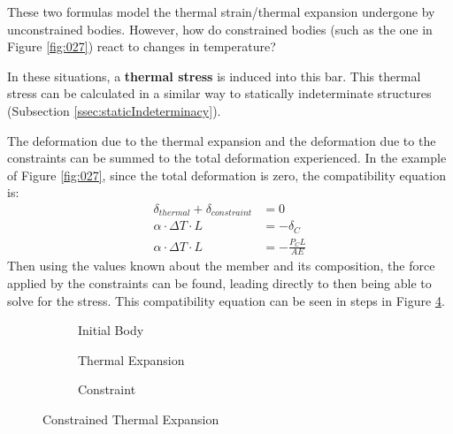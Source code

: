 \documentclass[12pt]{article}
\begin{document}
These two formulas model the thermal strain/thermal expansion undergone by unconstrained bodies. However, how do constrained bodies (such as the one in Figure \ref{fig:027}) react to changes in temperature?

In these situations, a \textbf{thermal stress} is induced into this bar. This thermal stress can be calculated in a similar way to statically indeterminate structures (Subsection \ref{ssec:staticIndeterminacy}).

The deformation due to the thermal expansion and the deformation due to the constraints can be summed to the total deformation experienced. In the example of Figure \ref{fig:027}, since the total deformation is zero, the compatibility equation is:
\begin{align*}
  \delta_{thermal} + \delta_{constraint} &= 0 \\
  \alpha \cdot \Delta T \cdot L &= - \delta_C \\
  \alpha \cdot \Delta T \cdot L &= -\frac{P_CL}{AE}
\end{align*}
Then using the values known about the member and its composition, the force applied by the constraints can be found, leading directly to then being able to solve for the stress. This compatibility equation can be seen in steps in Figure \ref{fig:constrainedThermalExpansion}.

\begin{figure}[H]
  \centering
  \begin{subfigure}[t!]{0.3\textwidth}
    \centering
    
    \caption{Initial Body}
    \label{fig:030}
  \end{subfigure}
  \begin{subfigure}[t!]{0.3\textwidth}
    \centering
    
    \caption{Thermal Expansion}
    \label{fig:031}
  \end{subfigure}
  \begin{subfigure}[t!]{0.3\textwidth}
    \centering
    
    \caption{Constraint}
    \label{fig:032}
  \end{subfigure}
  \caption{Constrained Thermal Expansion}
  \label{fig:constrainedThermalExpansion}
\end{figure}
\end{document}
